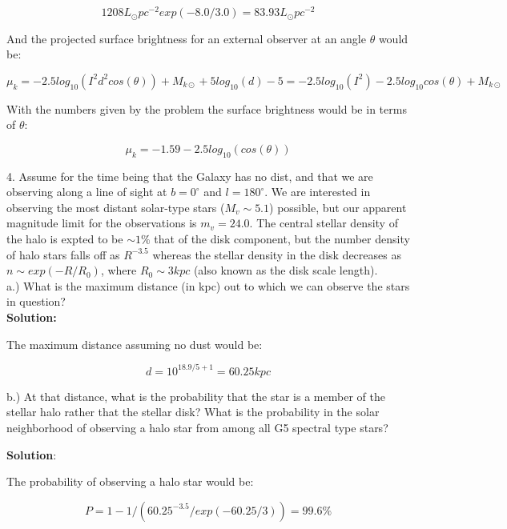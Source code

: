 \documentclass[14pt]{article}
\begin{document}
\begin{equation}
1208 L_{\odot} pc^{-2} exp(-8.0/3.0) = 83.93 L_{\odot} pc^{-2}
\end{equation}

And the projected surface brightness for an external observer 
at an angle $\theta$ would be: 

\begin{equation}
\mu_{k} = -2.5log_{10}(I^2d^2cos(\theta)) + M_{k{\odot}} + 5 log_{10}(d) -
5 = -2.5log_{10}(I^2) - 2.5log_{10}cos(\theta) + M_{k{\odot}}
\end{equation}

With the numbers given by the problem the surface brightness would be
in terms of $\theta$:

\begin{equation}
\mu_{k} = -1.59 -2.5log_{10}(cos(\theta))
\end{equation}

4. Assume for the time being that the Galaxy has no dist, and that we
are observing along a line of sight at $b=0^{\circ}$ and
$l=180^{\circ}$. We are interested in observing the most distant
solar-type stars ($M_v \sim 5.1$) possible, but our apparent magnitude
limit for the observations is $m_v =24.0$. The central stellar density
of the halo is expted to be $\sim 1\%$ that of the disk component, but
the number density of halo stars falls off as $R^{-3.5}$ whereas the
stellar density in the disk decreases as $n \sim exp(-R/R_0)$, where
$R_0\sim 3kpc$ (also known as the disk scale length). \\

a.) What is the maximum distance (in kpc) out to which we can observe
the stars in question?\\

\textbf{Solution:}

The maximum distance assuming no dust would be:

\begin{equation}
d = 10^{18.9/5+1} = 60.25 kpc
\end{equation}

b.) At that distance, what is the probability that the star is a
member of the stellar halo rather that the stellar disk? What is the
probability in the solar neighborhood of observing a halo star from
among all G5 spectral type stars?

\textbf{Solution}:

The probability of observing a halo star would be:

\begin{equation}
P = 1 - 1/(60.25^{-3.5}/exp(-60.25/3)) = 99.6 \%
\end{equation}
\end{document}
